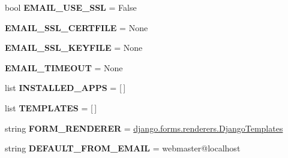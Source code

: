\begin{DoxyCompactItemize}
\item 
\mbox{\label{namespacedjango_1_1conf_1_1global__settings_af497b94c99b137859849fea351a6619d}} 
bool {\bfseries E\+M\+A\+I\+L\+\_\+\+U\+S\+E\+\_\+\+S\+SL} = False
\item 
\mbox{\label{namespacedjango_1_1conf_1_1global__settings_a96dafd0a4480c991c3441c6d94b3f044}} 
{\bfseries E\+M\+A\+I\+L\+\_\+\+S\+S\+L\+\_\+\+C\+E\+R\+T\+F\+I\+LE} = None
\item 
\mbox{\label{namespacedjango_1_1conf_1_1global__settings_a489164faf009660064c4397be4a4a6dd}} 
{\bfseries E\+M\+A\+I\+L\+\_\+\+S\+S\+L\+\_\+\+K\+E\+Y\+F\+I\+LE} = None
\item 
\mbox{\label{namespacedjango_1_1conf_1_1global__settings_a9e4e3c9b04ccefe692b1b8d398f9c8d2}} 
{\bfseries E\+M\+A\+I\+L\+\_\+\+T\+I\+M\+E\+O\+UT} = None
\item 
\mbox{\label{namespacedjango_1_1conf_1_1global__settings_a8faca62c5324686f8b7fa26e927dfcc6}} 
list {\bfseries I\+N\+S\+T\+A\+L\+L\+E\+D\+\_\+\+A\+P\+PS} = \mbox{[}$\,$\mbox{]}
\item 
\mbox{\label{namespacedjango_1_1conf_1_1global__settings_a27dfb3b76be73dfc53b76e076a3b6d1f}} 
list {\bfseries T\+E\+M\+P\+L\+A\+T\+ES} = \mbox{[}$\,$\mbox{]}
\item 
\mbox{\label{namespacedjango_1_1conf_1_1global__settings_adb442df0156f466cfea06660fa2ca1b0}} 
string {\bfseries F\+O\+R\+M\+\_\+\+R\+E\+N\+D\+E\+R\+ER} = \textquotesingle{}\mbox{\hyperlink{classdjango_1_1forms_1_1renderers_1_1_django_templates}{django.\+forms.\+renderers.\+Django\+Templates}}\textquotesingle{}
\item 
\mbox{\label{namespacedjango_1_1conf_1_1global__settings_ad0f695654d8aff683998991ead38992c}} 
string {\bfseries D\+E\+F\+A\+U\+L\+T\+\_\+\+F\+R\+O\+M\+\_\+\+E\+M\+A\+IL} = \textquotesingle{}webmaster@localhost\textquotesingle{}

\end{DoxyCompactItemize}
